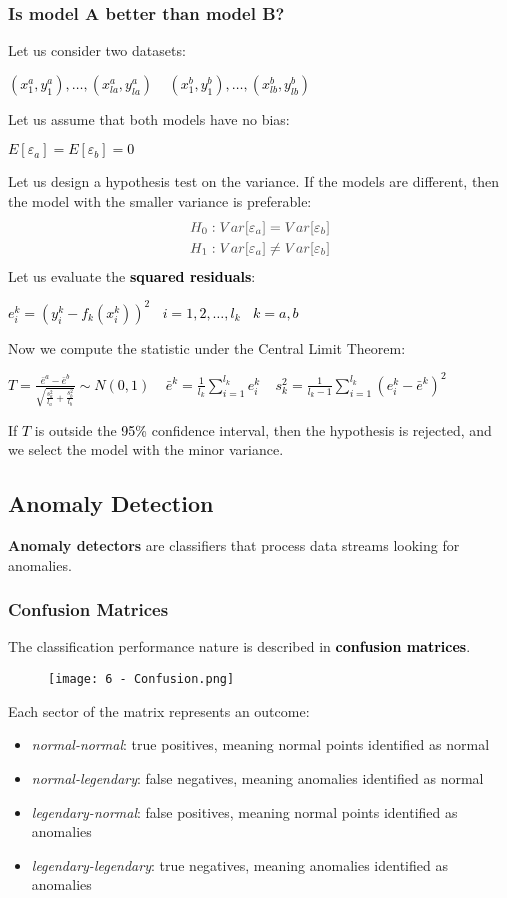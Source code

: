 \documentclass{article}
\newcommand{\bb}[1]{\textcolor{black}{\textbf{#1}}}
\newcommand{\rr}[1]{\textcolor{black}{#1}}
\newcommand{\cc}[1]{\begin{center}\textcolor{black}{#1}\end{center}}
\begin{document}
\subsubsection{Is model A better than model B?}
Let us consider two datasets:
\cc{$(x^a_1,y^a_1), \dots, (x^a_{la},y^a_{la}) \ \ \ \ \ (x^b_1,y^b_1), \dots, (x^b_{lb},y^b_{lb})$}
Let us assume that both models have no bias:
\cc{$E[\varepsilon_a] = E[\varepsilon_b] = 0$}
Let us design a hypothesis test on the variance. If the models are different, then the model with the smaller variance is preferable:
\begin{align*}
    &\textcolor{darkgray}{H_0:Var[\varepsilon_a] = Var[\varepsilon_b]} \\
    &\textcolor{darkgray}{H_1:Var[\varepsilon_a]\neq Var[\varepsilon_b]}
\end{align*}
Let us evaluate the \bb{squared residuals}:
\cc{$e^k_i=(y_i^k-f_k(x_i^k))^2 \ \ \ \ i = 1,2, \dots,l_k \ \ \ \ k=a,b$}
Now we compute the statistic under the Central Limit Theorem:
\cc{$T = \displaystyle\frac{\bar{e}^a-\bar{e}^b}{\sqrt{\displaystyle\frac{s^2_a}{l_a} + \displaystyle\frac{s^2_b}{l_b}}}\sim N(0,1) \ \ \ \ \ \bar{e}^k=\displaystyle\frac{1}{l_k}\displaystyle\sum^{l_k}_{i=1}e^k_i \ \ \ \ \ s^2_k=\displaystyle\frac{1}{l_k - 1} \displaystyle\sum^{l_k}_{i=1}(e^k_i-\bar{e}^k)^2$}
If \rr{$T$} is outside the \rr{95\%} confidence interval, then the hypothesis is rejected, and we select the model with the minor variance.

\subsection{Anomaly Detection}
\textbf{Anomaly detectors} are classifiers that process data streams looking for anomalies.
\subsubsection{Confusion Matrices}
The classification performance nature is described in \bb{confusion matrices}.
\begin{figure}[H]
    \centering
    \texttt{[image: 6 - Confusion.png]}
\end{figure}
Each sector of the matrix represents an outcome:
\begin{itemize}
    \item \textit{normal-normal}: true positives, meaning normal points identified as normal
    \item \textit{normal-legendary}: false negatives, meaning anomalies identified as normal
    \item \textit{legendary-normal}: false positives, meaning normal points identified as anomalies
    \item \textit{legendary-legendary}: true negatives, meaning anomalies identified as anomalies
\end{itemize}
\end{document}
